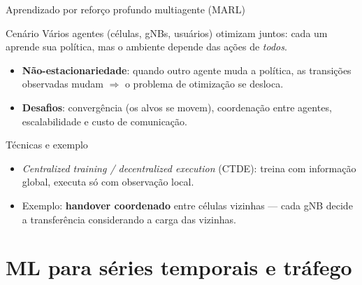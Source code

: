\documentclass[aspectratio=169,11pt]{beamer}
\begin{document}
\begin{frame}{Aprendizado por reforço profundo multiagente (MARL)}
  \begin{block}{Cenário}
    Vários agentes (células, gNBs, usuários) otimizam juntos: cada um aprende sua política, mas o ambiente depende das ações de \emph{todos}.
  \end{block}
  \begin{itemize}
    \item \textbf{Não-estacionariedade}: quando outro agente muda a política, as transições observadas mudam $\Rightarrow$ o problema de otimização se desloca.
    \item \textbf{Desafios}: convergência (os alvos se movem), coordenação entre agentes, escalabilidade e custo de comunicação.
  \end{itemize}
  \begin{exampleblock}{Técnicas e exemplo}
    \begin{itemize}
      \item \emph{Centralized training / decentralized execution} (CTDE): treina com informação global, executa só com observação local.
      \item Exemplo: \textbf{handover coordenado} entre células vizinhas --- cada gNB decide a transferência considerando a carga das vizinhas.
    \end{itemize}
  \end{exampleblock}
\end{frame}

\section{ML para séries temporais e tráfego}
\end{document}
